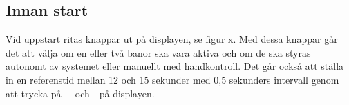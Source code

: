 \subsection{Innan start}

Vid uppstart ritas knappar ut på displayen, se figur x. Med dessa knappar går
det att välja om en eller två banor ska vara aktiva och om de ska styras
autonomt av systemet eller manuellt med handkontroll. Det går också att ställa
in en referenstid mellan 12 och 15 sekunder med 0,5 sekunders intervall genom
att trycka på + och - på displayen. 
